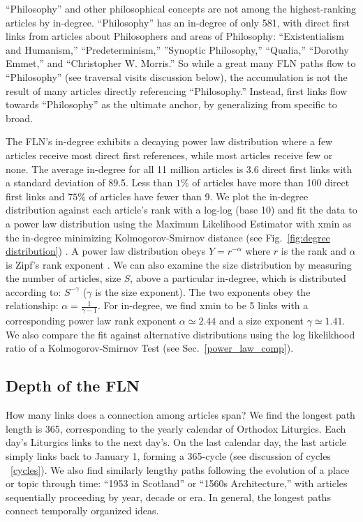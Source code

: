 \documentclass[pre,twocolumn,twoside,superscriptaddress,floatfix]{revtex4-1}
\begin{document}
{``Philosophy'' and other philosophical concepts
are not among the highest-ranking articles by in-degree.
``Philosophy'' has an in-degree of only 581, with direct first links from articles about Philosophers and areas of Philosophy: ``Existentialism and Humanism,'' ``Predeterminism,'' ''Synoptic Philosophy,'' ``Qualia,'' ``Dorothy Emmet,'' and ``Christopher W. Morris.''
So while a great many FLN paths flow to 
``Philosophy'' (see traversal visits discussion below), 
the accumulation is not the 
result of many articles directly referencing ``Philosophy.'' 
Instead, first links flow towards ``Philosophy'' as the 
ultimate anchor, by generalizing from specific to broad.

The FLN's in-degree exhibits a decaying power law distribution where a few articles 
receive most direct first references, while most articles receive few or none.
The average in-degree for all 11 million articles is 3.6 direct first links with a standard deviation of 89.5.
Less than $1\%$ of articles have more than 100 direct first links and $75\%$ of articles
have fewer than 9. 
We plot the in-degree distribution against each article's rank with a log-log (base 10) and fit the data to a power law 
distribution using the Maximum Likelihood Estimator with xmin as the in-degree minimizing Kolmogorov-Smirnov distance
(see Fig.~\ref{fig:degree distribution}) 
\cite{clauset2009power, alstott2014powerlaw}
.
A power law distribution obeys $Y = r^{-\alpha}$ where $r$ is the rank and $\alpha$ is Zipf's rank
exponent
\cite{zipf1949human}
. We can also examine the size distribution by measuring the number of articles, size $S$, above
a particular in-degree, which is distributed according to: $S^{-\gamma}$ ($\gamma$ is the size exponent). 
The two exponents obey the relationship: $\alpha = \frac{1}{\gamma -1}$.
For in-degree, we find xmin to be 5 links with a corresponding power law rank exponent $\alpha \simeq 2.44$ and a size exponent $\gamma \simeq 1.41$. 
We also compare the fit against alternative distributions using the log likelikhood ratio of a Kolmogorov-Smirnov Test 
(see Sec.~\ref{power_law_comp}).

\subsection{Depth of the FLN}

How many links does a connection among articles span? 
We find the longest path length is 365,
corresponding to the yearly calendar of Orthodox Liturgics.
Each day's Liturgics links to the next day's. On the last calendar day, the last article simply links back to January 1, forming a 365-cycle 
(see discussion of cycles ~\ref{cycles}).
We also find similarly lengthy paths following the evolution of a place or topic through time: 
``1953 in Scotland'' or ``1560s Architecture,'' with articles sequentially proceeding by year, decade or era.
In general, the longest paths connect temporally organized ideas.

}
\end{document}
